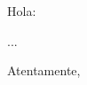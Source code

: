 \documentclass[letterpaper,12pt]{letter}
\begin{document}
\signature{Juan Pedro Villa Isaza}

\address{}
\date{El Retiro, \today}

\begin{letter}{}

\opening{Hola:}

...

\closing{Atentamente,}

\end{letter}
\end{document}
